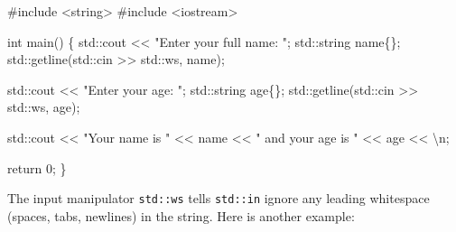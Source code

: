 \documentclass[
  letterpaper,
  DIV=11,
  numbers=noendperiod]{scrreprt}
\newenvironment{Shaded}{\begin{snugshade}}{\end{snugshade}}
\newcommand{\CommentTok}[1]{\textcolor[rgb]{0.37,0.37,0.37}{#1}}
\newcommand{\DecValTok}[1]{\textcolor[rgb]{0.68,0.00,0.00}{#1}}
\newcommand{\ErrorTok}[1]{\textcolor[rgb]{0.68,0.00,0.00}{#1}}
\newcommand{\FunctionTok}[1]{\textcolor[rgb]{0.28,0.35,0.67}{#1}}
\newcommand{\NormalTok}[1]{\textcolor[rgb]{0.00,0.23,0.31}{#1}}
\newcommand{\SpecialCharTok}[1]{\textcolor[rgb]{0.37,0.37,0.37}{#1}}
\newcommand{\StringTok}[1]{\textcolor[rgb]{0.13,0.47,0.30}{#1}}
\begin{document}
\begin{Shaded}
\begin{Highlighting}[]
\CommentTok{\#include \textless{}string\textgreater{}}
\CommentTok{\#include \textless{}iostream\textgreater{}}

\NormalTok{int }\FunctionTok{main}\NormalTok{()}
\NormalTok{\{}
\NormalTok{    std}\SpecialCharTok{::}\NormalTok{cout }\SpecialCharTok{\textless{}}\ErrorTok{\textless{}} \StringTok{"Enter your full name: "}\NormalTok{;}
\NormalTok{    std}\SpecialCharTok{::}\NormalTok{string name\{\};}
\NormalTok{    std}\SpecialCharTok{::}\FunctionTok{getline}\NormalTok{(std}\SpecialCharTok{::}\NormalTok{cin }\SpecialCharTok{\textgreater{}}\ErrorTok{\textgreater{}}\NormalTok{ std}\SpecialCharTok{::}\NormalTok{ws, name);}

\NormalTok{    std}\SpecialCharTok{::}\NormalTok{cout }\SpecialCharTok{\textless{}}\ErrorTok{\textless{}} \StringTok{"Enter your age: "}\NormalTok{;}
\NormalTok{    std}\SpecialCharTok{::}\NormalTok{string age\{\};}
\NormalTok{    std}\SpecialCharTok{::}\FunctionTok{getline}\NormalTok{(std}\SpecialCharTok{::}\NormalTok{cin }\SpecialCharTok{\textgreater{}}\ErrorTok{\textgreater{}}\NormalTok{ std}\SpecialCharTok{::}\NormalTok{ws, age);}

\NormalTok{    std}\SpecialCharTok{::}\NormalTok{cout }\SpecialCharTok{\textless{}}\ErrorTok{\textless{}} \StringTok{"Your name is "} \SpecialCharTok{\textless{}}\ErrorTok{\textless{}}\NormalTok{ name }\SpecialCharTok{\textless{}}\ErrorTok{\textless{}} \StringTok{" and your age is "} \SpecialCharTok{\textless{}}\ErrorTok{\textless{}}\NormalTok{ age }\SpecialCharTok{\textless{}}\ErrorTok{\textless{}} \StringTok{\textquotesingle{}}\SpecialCharTok{\textbackslash{}n}\StringTok{\textquotesingle{}}\NormalTok{;}

\NormalTok{    return }\DecValTok{0}\NormalTok{;}
\NormalTok{\}}
\end{Highlighting}
\end{Shaded}

The input manipulator \texttt{std::ws} tells \texttt{std::in} ignore any
leading whitespace (spaces, tabs, newlines) in the string. Here is
another example:
\end{document}
